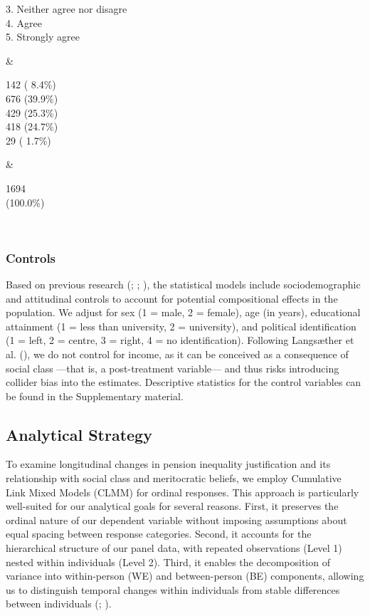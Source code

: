 \documentclass[
  12pt,
]{article}
\begin{document}
\begin{longtable}[]
\begin{minipage}[t]{\linewidth}
3. Neither agree nor disagre\\
4. Agree\\
5. Strongly agree\strut
\end{minipage} & \begin{minipage}[t]{\linewidth}\raggedright
142 ( 8.4\%)\\
676 (39.9\%)\\
429 (25.3\%)\\
418 (24.7\%)\\
29 ( 1.7\%)\strut
\end{minipage} & \begin{minipage}[t]{\linewidth}\raggedright
1694\\
(100.0\%)\strut
\end{minipage} \\
\end{longtable}

\subsubsection{Controls}\label{controls}

Based on previous research
(;
;
), the statistical models
include sociodemographic and attitudinal controls to account for
potential compositional effects in the population. We adjust for sex (1
= male, 2 = female), age (in years), educational attainment (1 = less
than university, 2 = university), and political identification (1 =
left, 2 = centre, 3 = right, 4 = no identification). Following
Langsæther et al. (), we
do not control for income, as it can be conceived as a consequence of
social class ---that is, a post-treatment variable--- and thus risks
introducing collider bias into the estimates. Descriptive statistics for
the control variables can be found in the Supplementary material.

\subsection{Analytical Strategy}\label{analytical-strategy}

To examine longitudinal changes in pension inequality justification and
its relationship with social class and meritocratic beliefs, we employ
Cumulative Link Mixed Models (CLMM) for ordinal responses. This approach
is particularly well-suited for our analytical goals for several
reasons. First, it preserves the ordinal nature of our dependent
variable without imposing assumptions about equal spacing between
response categories. Second, it accounts for the hierarchical structure
of our panel data, with repeated observations (Level 1) nested within
individuals (Level 2). Third, it enables the decomposition of variance
into within-person (WE) and between-person (BE) components, allowing us
to distinguish temporal changes within individuals from stable
differences between individuals (; ).
\end{document}
